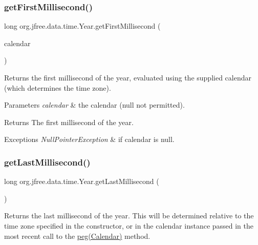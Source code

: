 \subsubsection{\texorpdfstring{get\+First\+Millisecond()}{getFirstMillisecond()}\hspace{0.1cm}{\footnotesize\ttfamily [2/2]}}
{\footnotesize\ttfamily long org.\+jfree.\+data.\+time.\+Year.\+get\+First\+Millisecond (\begin{DoxyParamCaption}\item[{Calendar}]{calendar }\end{DoxyParamCaption})}

Returns the first millisecond of the year, evaluated using the supplied calendar (which determines the time zone).


\begin{DoxyParams}{Parameters}
{\em calendar} & the calendar ({\ttfamily null} not permitted).\\
\hline
\end{DoxyParams}
\begin{DoxyReturn}{Returns}
The first millisecond of the year.
\end{DoxyReturn}

\begin{DoxyExceptions}{Exceptions}
{\em Null\+Pointer\+Exception} & if {\ttfamily calendar} is {\ttfamily null}. \\
\hline
\end{DoxyExceptions}
\mbox{\label{classorg_1_1jfree_1_1data_1_1time_1_1_year_a57299a0e16c221eebc2f69e9daefc6ff}} 
\subsubsection{\texorpdfstring{get\+Last\+Millisecond()}{getLastMillisecond()}\hspace{0.1cm}{\footnotesize\ttfamily [1/2]}}
{\footnotesize\ttfamily long org.\+jfree.\+data.\+time.\+Year.\+get\+Last\+Millisecond (\begin{DoxyParamCaption}{ }\end{DoxyParamCaption})}

Returns the last millisecond of the year. This will be determined relative to the time zone specified in the constructor, or in the calendar instance passed in the most recent call to the \mbox{\hyperlink{classorg_1_1jfree_1_1data_1_1time_1_1_year_a98c518e97ade2b6267e1b421b0f91162}{peg(\+Calendar)}} method.

